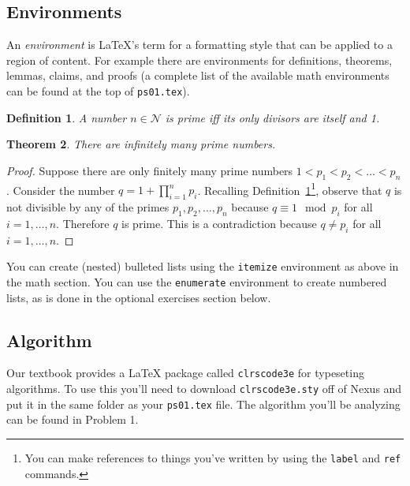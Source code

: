 \documentclass[11pt]{article}
\newtheorem{theorem}{Theorem}
\newtheorem{definition}[theorem]{Definition}
\theoremstyle{nonumberplain}
\newtheorem{proof}{Proof}
\newcommand{\NN}{\mathcal{N}} %
\begin{document}
\subsection*{Environments}

An \emph{environment} is \LaTeX{}'s term for a formatting style that
can be applied to a region of content.  For example there are
environments for definitions, theorems, lemmas, claims, and proofs (a
complete list of the available math environments can be found at the
top of \texttt{ps01.tex}).

\begin{definition}
\label{def:prime}
A number $n \in \NN$ is \emph{prime} iff its only divisors are itself
and 1.
\end{definition}

\begin{theorem}
There are infinitely many prime numbers.
\end{theorem}

\begin{proof}
Suppose there are only finitely many prime numbers $1 < p_1 < p_2 <
\ldots < p_n$.  Consider the number $q = 1 + \prod_{i = 1}^n p_i$.
Recalling Definition~\ref{def:prime}\footnote{You can make references
  to things you've written by using the \texttt{label} and
  \texttt{ref} commands.}, observe that $q$ is not divisible by any of
the primes $p_1,p_2,\ldots,p_n$ because $q \equiv 1 \mod p_i$ for all
$i = 1,\ldots,n$.  Therefore $q$ is prime.  This is a contradiction
because $q \neq p_i$ for all $i = 1,\ldots,n$.
\end{proof}

You can create (nested) bulleted lists using the \texttt{itemize}
environment as above in the math section.  You can use the
\texttt{enumerate} environment to create numbered lists, as is done in
the optional exercises section below.

\subsection*{Algorithm}

Our textbook provides a \LaTeX{} package called \texttt{clrscode3e}
for typeseting algorithms.  To use this you'll need to download
\texttt{clrscode3e.sty} off of Nexus and put it in the same folder as
your \texttt{ps01.tex} file.  The algorithm you'll be analyzing can be
found in Problem 1.
\end{document}
